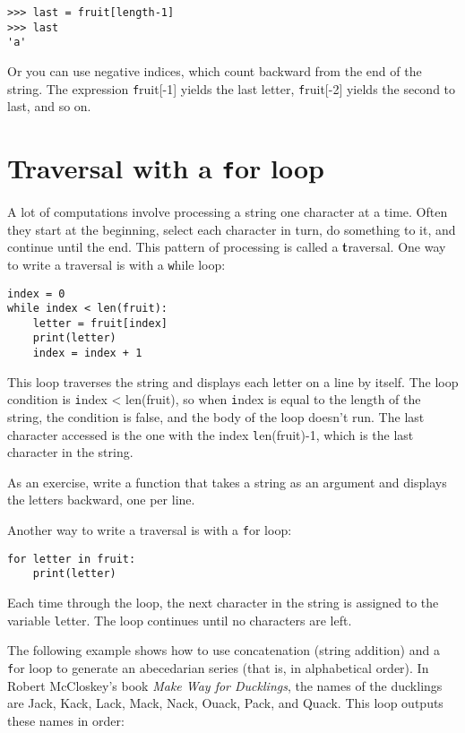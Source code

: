 \documentclass[
DIV=11,
fontsize=13,
twoside,
headinclude=false,
titlepage=firstiscover,
abstract=true,
headsepline=true,
footsepline=true,
chapterprefix=true, %
headings=big,
bibliography=totoc,%
captions=tableheading
]{scrbook}
\theoremstyle{definition}
\begin{document}
\begin{lstlisting}
>>> last = fruit[length-1]
>>> last
'a'
\end{lstlisting}
%
Or you can use negative indices, which count backward from
the end of the string.  The expression {\texttt fruit[-1]} yields the last
letter, {\texttt fruit[-2]} yields the second to last, and so on.


\section{Traversal with a {\texttt for} loop}
\label{for}

A lot of computations involve processing a string one character at a
time.  Often they start at the beginning, select each character in
turn, do something to it, and continue until the end.  This pattern of
processing is called a {\textbf traversal}.  One way to write a traversal
is with a {\texttt while} loop:

\begin{lstlisting}
index = 0
while index < len(fruit):
    letter = fruit[index]
    print(letter)
    index = index + 1
\end{lstlisting}
%
This loop traverses the string and displays each letter on a line by
itself.  The loop condition is {\texttt index < len(fruit)}, so
when {\texttt index} is equal to the length of the string, the
condition is false, and the body of the loop doesn't run.  The
last character accessed is the one with the index {\texttt len(fruit)-1},
which is the last character in the string.

As an exercise, write a function that takes a string as an argument
and displays the letters backward, one per line.

Another way to write a traversal is with a {\texttt for} loop:

\begin{lstlisting}
for letter in fruit:
    print(letter)
\end{lstlisting}
%
Each time through the loop, the next character in the string is assigned
to the variable {\texttt letter}.  The loop continues until no characters are
left.

The following example shows how to use concatenation (string addition)
and a {\texttt for} loop to generate an abecedarian series (that is, in
alphabetical order).  In Robert McCloskey's book {\em Make
Way for Ducklings}, the names of the ducklings are Jack, Kack, Lack,
Mack, Nack, Ouack, Pack, and Quack.  This loop outputs these names in
order:
\end{document}
